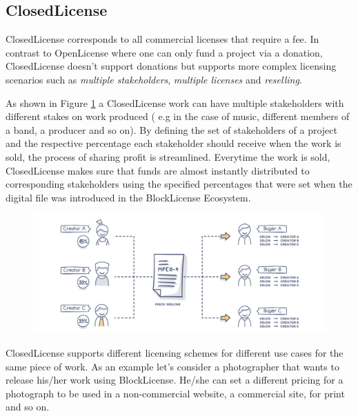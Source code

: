 
\subsection{ClosedLicense}

ClosedLicense corresponds to all commercial licenses that require a fee. In contrast to OpenLicense where one can only fund a project via a donation, ClosedLicense doesn't support donations but supports more complex licensing scenarios such as \textit{multiple stakeholders}, \textit{multiple licenses} and \textit{reselling}.

As shown in Figure \ref{fig:stakeholders} a ClosedLicense work can have multiple stakeholders with different stakes on work produced ( e.g in the case of music, different members of a band, a producer and so on). By defining the set of stakeholders of a project and the respective percentage each stakeholder should receive when the work is sold, the process of sharing profit is streamlined. Everytime the work is sold, ClosedLicense makes sure that funds are almost instantly distributed to corresponding stakeholders using the specified percentages that were set when the digital file was introduced in the BlockLicense Ecosystem.

\begin{figure}[h]
\centering
\begin{minipage}{1\textwidth}
  \centering
  \includegraphics[width=1\linewidth]{./figures/fig5.png}
  \label{fig:stakeholders}
\end{minipage}
\end{figure}

ClosedLicense supports different licensing schemes for different use cases for the same piece of work. As an example let's consider a photographer that wants to release his/her work using BlockLicense. He/she can set a different pricing for a photograph to be used in a non-commercial website, a commercial site, for print and so on.

